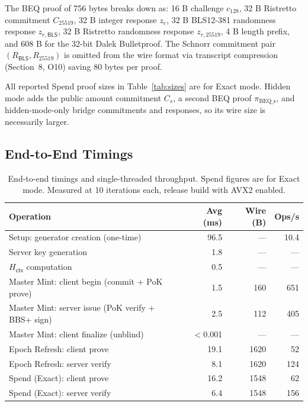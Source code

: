 \documentclass[11pt]{article}
\theoremstyle{definitionstyle}
\theoremstyle{plain}
\begin{document}
The BEQ proof of 756 bytes breaks down as: 16 B challenge $c_{128}$,
32 B Ristretto commitment $C_{25519}$, 32 B integer response $z_e$,
32 B BLS12-381 randomness response $z_{r,\mathsf{BLS}}$, 32 B Ristretto
randomness response $z_{r,25519}$, 4 B length prefix, and 608 B for the
32-bit Dalek Bulletproof.  The Schnorr commitment pair $(R_{\mathsf{BLS}},
R_{25519})$ is omitted from the wire format via transcript compression
(Section~8, O10) saving 80 bytes per proof.

All reported Spend proof sizes in Table~\ref{tab:sizes} are for Exact mode.
Hidden mode adds the public amount commitment $C_s$, a second BEQ proof
$\pi_{\text{BEQ\_s}}$, and hidden-mode-only bridge commitments and responses,
so its wire size is necessarily larger.

\subsection{End-to-End Timings}

\begin{table}[htbp]
\centering
\small
\begin{tabular}{|l|r|r|r|}
\hline
\textbf{Operation} & \textbf{Avg (ms)} & \textbf{Wire (B)} & \textbf{Ops/s} \\
\hline
Setup: generator creation (one-time) & 96.5 & --- & 10.4 \\
Server key generation                &  1.8 & --- & --- \\
$H_{\mathsf{ctx}}$ computation       &  0.5 & --- & --- \\
\hline
Master Mint: client begin (commit + PoK prove)    & 1.5 & 160 & 651 \\
Master Mint: server issue (PoK verify + BBS+ sign)& 2.5 & 112 & 405 \\
Master Mint: client finalize (unblind)            & $<$0.001 & --- & --- \\
\hline
Epoch Refresh: client prove  & 19.1 & 1620 &  52 \\
Epoch Refresh: server verify &  8.1 & 1620 & 124 \\
\hline
Spend (Exact): client prove  & 16.2 & 1548 &  62 \\
Spend (Exact): server verify &  6.4 & 1548 & 156 \\
\hline
\end{tabular}
\caption{End-to-end timings and single-threaded throughput.  Spend figures are
for Exact mode.  Measured at 10 iterations each, release build with AVX2 enabled.}
\label{tab:e2e}
\end{table}
\end{document}
